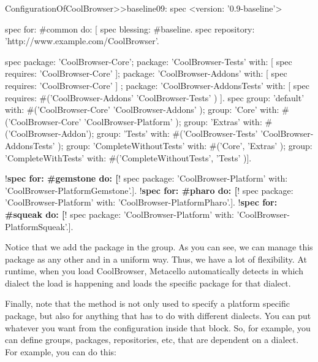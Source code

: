 \documentclass[a4paper,10pt,twoside]{book}
\begin{document}
\begin{code}{}
ConfigurationOfCoolBrowser>>baseline09: spec 
	<version: '0.9-baseline'>
	
	spec for: #common do: [
		spec blessing: #baseline.
		spec repository: 'http://www.example.com/CoolBrowser'.
		
		spec 
			package: 'CoolBrowser-Core';
			package: 'CoolBrowser-Tests' with: [ spec requires: 'CoolBrowser-Core' ];
			package: 'CoolBrowser-Addons' with: [ spec requires: 'CoolBrowser-Core' ] ;
			package: 'CoolBrowser-AddonsTests' with: [ 
				spec requires: #('CoolBrowser-Addons' 'CoolBrowser-Tests' ) ].
		spec 
			group: 'default' with: #('CoolBrowser-Core' 'CoolBrowser-Addons' );
			group: 'Core' with: #('CoolBrowser-Core' 'CoolBrowser-Platform' );
			group: 'Extras' with: #('CoolBrowser-Addon');
			group: 'Tests' with: #('CoolBrowser-Tests' 'CoolBrowser-AddonsTests' );
			group: 'CompleteWithoutTests' with: #('Core', 'Extras' );
			group: 'CompleteWithTests' with: #('CompleteWithoutTests', 'Tests' )].
			
	!\textbf{spec for: \#gemstone do: [}!
		spec package: 'CoolBrowser-Platform' with: 'CoolBrowser-PlatformGemstone'.].
	!\textbf{spec for: \#pharo do: [}!
		spec package: 'CoolBrowser-Platform' with: 'CoolBrowser-PlatformPharo'.].
	!\textbf{spec for: \#squeak do: [}!
		spec package: 'CoolBrowser-Platform' with: 'CoolBrowser-PlatformSqueak'.].
\end{code}

Notice that we add the package  in the  group. As you can see, we can manage this package as any other and in a uniform way. Thus, we have a lot of flexibility. At runtime, when you load CoolBrowser, Metacello automatically detects in which dialect the load is happening and loads the specific package for that dialect.  	

Finally, note that the method  is not only used to specify a platform specific package, but also for anything that has to do with different dialects. You can put whatever you want from the configuration inside that block. So, for example, you can define groups, packages, repositories, etc, that are dependent on a dialect. For example, you can do this:
\end{document}
